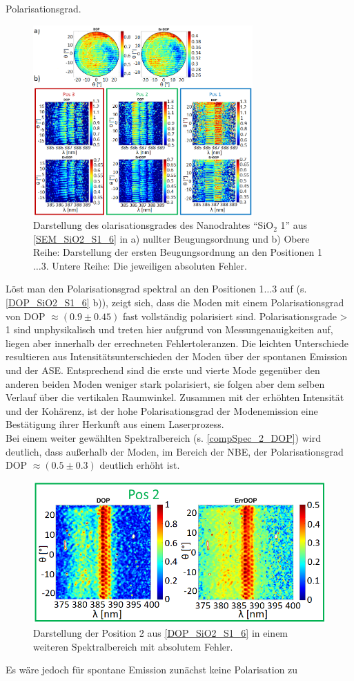 Polarisationsgrad.\begin{figure}[b]
\includegraphics[width=0.75\textwidth]{Bilder/SiO2/DOP_SiO2_S1_6}
\caption{Darstellung des olarisationsgrades des Nanodrahtes ``SiO$_\text{2}$ 1''
aus \autoref{SEM_SiO2_S1_6} in a) nullter Beugungsordnung und b) Obere Reihe:
Darstellung der ersten Beugungsordnung an den Positionen 1$\ldots$3. Untere
Reihe: Die jeweiligen absoluten Fehler.} \label{DOP_SiO2_S1_6} \end{figure}Löst
man den Polarisationsgrad spektral an den Positionen 1$\ldots$3 auf (s.
\autoref{DOP_SiO2_S1_6} b)), zeigt sich, dass die Moden mit einem
Polarisationsgrad von DOP $\approx (\text{0.9}\pm\text{0.45})$ fast vollständig
polarisiert sind. Polarisationsgrade > 1 sind unphysikalisch und treten hier
aufgrund von Messungenauigkeiten auf, liegen aber innerhalb der errechneten
Fehlertoleranzen. Die leichten Unterschiede resultieren aus
Intensitätsunterschieden der Moden über der spontanen Emission und der ASE.
Entsprechend sind die erste und vierte Mode gegenüber den anderen beiden Moden
weniger stark polarisiert, sie folgen aber dem selben Verlauf über die
vertikalen Raumwinkel. Zusammen mit der erhöhten Intensität und der Kohärenz,
ist der hohe Polarisationsgrad der Modenemission eine Bestätigung ihrer Herkunft
aus einem Laserprozess.\\ Bei einem weiter gewählten Spektralbereich (s.
\autoref{compSpec_2_DOP}) wird deutlich, dass außerhalb der Moden, im Bereich
der NBE, der Polarisationsgrad DOP $\approx (\text{0.5} \pm \text{0.3})$
deutlich erhöht ist.\begin{figure}[h]
\includegraphics[width=.55\textwidth]{Bilder/SiO2/compSpec_2_DOP}
\caption{Darstellung der Position 2 aus \autoref{DOP_SiO2_S1_6} in einem
weiteren Spektralbereich mit absolutem Fehler.} \label{compSpec_2_DOP}
\end{figure}Es wäre jedoch für spontane Emission zunächst keine Polarisation zu
